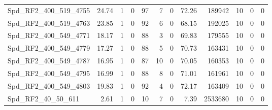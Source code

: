\begin{longtable}[c]{@{}lrrrrrrrrrrr@{}}
Spd\_RF2\_400\_519\_4755      & 24.74                  & 1                       & 0                       & 97                     & 7                       & 0                       & 72.26                   & 189942                   & 10                       & 0                        & 0                        \\
Spd\_RF2\_400\_519\_4763      & 23.85                  & 1                       & 0                       & 92                     & 6                       & 0                       & 68.15                   & 192025                   & 10                       & 0                        & 0                        \\
Spd\_RF2\_400\_549\_4771      & 18.17                  & 1                       & 0                       & 88                     & 3                       & 0                       & 69.83                   & 179555                   & 10                       & 0                        & 0                        \\
Spd\_RF2\_400\_549\_4779      & 17.27                  & 1                       & 0                       & 88                     & 5                       & 0                       & 70.73                   & 163431                   & 10                       & 0                        & 0                        \\
Spd\_RF2\_400\_549\_4787      & 16.95                  & 1                       & 0                       & 87                     & 10                      & 0                       & 70.05                   & 160353                   & 10                       & 0                        & 0                        \\
Spd\_RF2\_400\_549\_4795      & 16.99                  & 1                       & 0                       & 88                     & 8                       & 0                       & 71.01                   & 161961                   & 10                       & 0                        & 0                        \\
Spd\_RF2\_400\_549\_4803      & 19.83                  & 1                       & 0                       & 92                     & 4                       & 0                       & 72.17                   & 163409                   & 10                       & 0                        & 0                        \\
Spd\_RF2\_40\_50\_611         & 2.61                   & 1                       & 0                       & 10                     & 7                       & 0                       & 7.39                    & 2533680                  & 10                       & 0                        & 0                        \\

\end{longtable}
